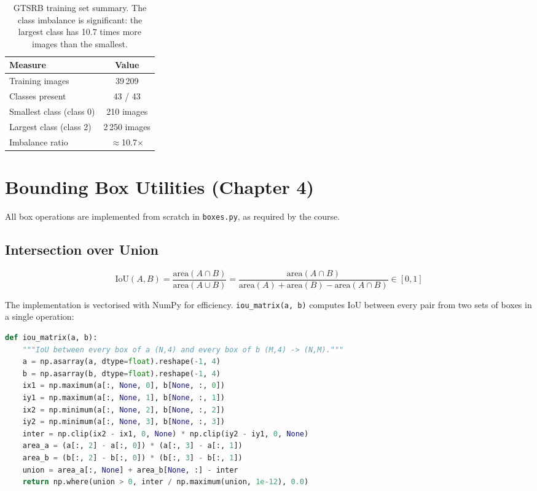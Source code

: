 \documentclass[12pt,a4paper]{article}
\begin{document}
\begin{table}[H]
\centering
\renewcommand{\arraystretch}{1.3}
\begin{tabular}{lc}
\toprule
\textbf{Measure} & \textbf{Value} \\
\midrule
Training images          & 39\,209 \\
Classes present          & 43 / 43 \\
Smallest class (class 0) & 210 images \\
Largest class (class 2)  & 2\,250 images \\
Imbalance ratio          & $\approx$10.7$\times$ \\
\bottomrule
\end{tabular}
\caption{GTSRB training set summary. The class imbalance is significant: the largest class has 10.7 times more images than the smallest.}
\label{tab:gtsrb_eda}
\end{table}

\section{Bounding Box Utilities (Chapter 4)}
\label{sec:boxes}

All box operations are implemented from scratch in \texttt{boxes.py}, as required by the course.

\subsection{Intersection over Union}

\begin{mathbox}[title=IoU Formula]
\[
\mathrm{IoU}(A,B) = \frac{\mathrm{area}(A \cap B)}{\mathrm{area}(A \cup B)} = \frac{\mathrm{area}(A \cap B)}{\mathrm{area}(A) + \mathrm{area}(B) - \mathrm{area}(A \cap B)} \in [0, 1]
\]
\end{mathbox}

The implementation is vectorised with NumPy for efficiency. \texttt{iou\_matrix(a, b)} computes IoU between every pair from two sets of boxes in a single operation:

\begin{lstlisting}[language=Python, caption={Vectorised IoU matrix computation.}]
def iou_matrix(a, b):
    """IoU between every box of a (N,4) and every box of b (M,4) -> (N,M)."""
    a = np.asarray(a, dtype=float).reshape(-1, 4)
    b = np.asarray(b, dtype=float).reshape(-1, 4)
    ix1 = np.maximum(a[:, None, 0], b[None, :, 0])
    iy1 = np.maximum(a[:, None, 1], b[None, :, 1])
    ix2 = np.minimum(a[:, None, 2], b[None, :, 2])
    iy2 = np.minimum(a[:, None, 3], b[None, :, 3])
    inter = np.clip(ix2 - ix1, 0, None) * np.clip(iy2 - iy1, 0, None)
    area_a = (a[:, 2] - a[:, 0]) * (a[:, 3] - a[:, 1])
    area_b = (b[:, 2] - b[:, 0]) * (b[:, 3] - b[:, 1])
    union = area_a[:, None] + area_b[None, :] - inter
    return np.where(union > 0, inter / np.maximum(union, 1e-12), 0.0)
\end{lstlisting}
\end{document}
